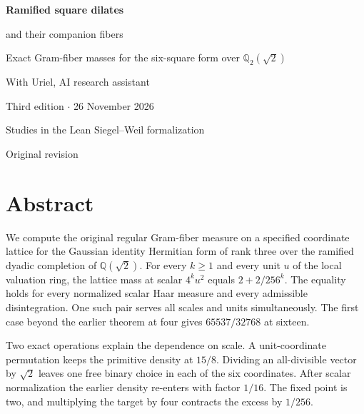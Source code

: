 \documentclass[12pt,letterpaper]{article}
\newcommand{\code}[1]{\texttt{\detokenize{#1}}}
\begin{document}
\thispagestyle{empty}
\begin{center}\par\vspace{.46in}
{\fontsize{30}{35}\selectfont\bfseries\color{ink}Ramified square dilates\par and their companion fibers}\par\vspace{.23in}
\begin{minipage}{.87\linewidth}\centering\Large Exact Gram-fiber masses for the six-square form over $\mathbb Q_2(\sqrt{2})$\end{minipage}
\par\vspace{.35in}
\par\vspace{.45in}{\large Justin Candler}\par With Uriel, AI research assistant\par Third edition $\cdot$ 26 November 2026\end{center}\vfill
\begin{center}\sffamily Studies in the Lean Siegel--Weil formalization\par\small Original revision \code{40e56bab}\end{center}
\clearpage\section*{Abstract}
We compute the original regular Gram-fiber measure on a specified coordinate lattice for the Gaussian identity Hermitian form of rank three over the ramified dyadic completion of $\mathbb Q(\sqrt2)$. For every $k\ge1$ and every unit $u$ of the local valuation ring, the lattice mass at scalar $4^ku^2$ equals $2+2/256^k$. The equality holds for every normalized scalar Haar measure and every admissible disintegration. One such pair serves all scales and units simultaneously. The first case beyond the earlier theorem at four gives $65537/32768$ at sixteen.
\par
Two exact operations explain the dependence on scale. A unit-coordinate permutation keeps the primitive density at $15/8$. Dividing an all-divisible vector by $\sqrt2$ leaves one free binary choice in each of the six coordinates. After scalar normalization the earlier density re-enters with factor $1/16$. The fixed point is two, and multiplying the target by four contracts the excess by $1/256$.
\end{document}

